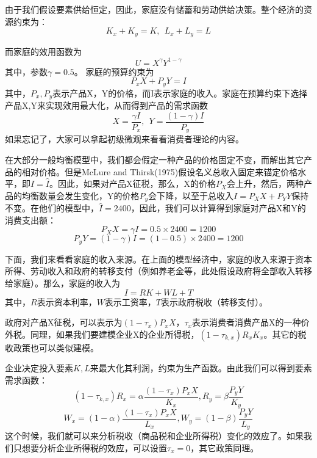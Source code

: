 \documentclass[cn,10pt,math=newtx,citestyle=gb7714-2015,bibstyle=gb7714-2015]{elegantbook}
\begin{document}
	由于我们假设要素供给恒定，因此，家庭没有储蓄和劳动供给决策。整个经济的资源约束为：
	\begin{equation}
		K_x+K_y=K,~~L_x+L_y=L
	\end{equation}
	
	而家庭的效用函数为
	\begin{equation}
		U=X^\gamma Y^{1-\gamma}
	\end{equation}
	其中，参数$\gamma=0.5$。
	家庭的预算约束为
	\begin{equation}
		P_xX+P_yY=I
	\end{equation}
	其中，$P_x,P_y$表示产品X，Y的价格，而I表示家庭的收入。家庭在预算约束下选择产品X,Y来实现效用最大化，从而得到产品的需求函数
	\begin{equation}
		X=\frac{\gamma I}{P_x},~~Y=\frac{(1-\gamma) I}{P_y}
	\end{equation}
	如果忘记了，大家可以拿起初级微观来看看消费者理论的内容。
	
	在大部分一般均衡模型中，我们都会假定一种产品的价格固定不变，而解出其它产品的相对价格。但是McLure and Thirsk(1975)假设名义总收入固定来锚定价格水平，即$I=\hat{I}$。因此，如果对产品X征税，那么，X的价格$P_X$会上升，然后，两种产品的均衡数量会发生变化，Y的价格$P_y$会下降，以至于总收入$I=P_XX+P_YY$保持不变。在他们的模型中，$\hat{I}=2400$，因此，我们可以计算得到家庭对产品X和Y的消费支出额：
	\begin{equation}
		P_XX=\gamma I=0.5 \times 2400=1200
	\end{equation}
	\begin{equation}
		P_yY=(1-\gamma) I=(1-0.5) \times 2400=1200
	\end{equation}
	
	下面，我们来看看家庭的收入来源。在上面的模型经济中，家庭的收入来源于资本所得、劳动收入和政府的转移支付（例如养老金等，此处假设政府将全部收入转移给家庭）。那么，家庭的收入为
	\begin{equation}
		I=RK+WL+T
	\end{equation}
	其中，$R$表示资本利率，$W$表示工资率，$T$表示政府税收（转移支付）。
	
	政府对产品X征税，可以表示为$(1-\tau_x)P_xX$，$\tau_x$表示消费者消费产品X的一种价外税。同理，如果我们要建模企业X的企业所得税，$(1-\tau_{k,x})R_xK_x$。其它的税收政策也可以类似建模。
	
	企业决定投入要素$K,L$来最大化其利润，约束为生产函数。由此我们可以得到要素需求函数：
	\begin{equation}
		(1-\tau_{k,x})R_x=\alpha \frac{(1-\tau_x)P_xX}{K_x},R_y=\beta \frac{P_yY}{K_y}
	\end{equation}
	\begin{equation}
		W_x=(1-\alpha) \frac{(1-\tau_x)P_xX}{L_x},W_y=(1-\beta) \frac{P_yY}{L_y}
	\end{equation}
	这个时候，我们就可以来分析税收（商品税和企业所得税）变化的效应了。如果我们只想要分析企业所得税的效应，可以设置$\tau_x=0$，其它政策同理。
	
\end{document}
